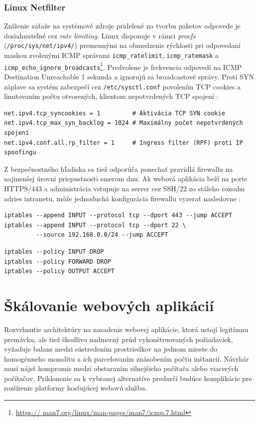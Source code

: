 \documentclass[12pt, a4paper]{article}
\begin{document}
\subsubsection{Linux Netfilter}
Zníženie záťaže na systémové zdroje pridelené na tvorbu paketov odpovede je dosiahnuteľné cez 
\emph{rate limiting}. Linux disponuje v rámci \emph{procfs} (\verb|/proc/sys/net/ipv4/|) premennými 
na obmedzenie rýchlosti pri odpovedaní maskou zvolenými ICMP správami \verb|icmp_ratelimit|, 
\verb|icmp_ratemask| a \verb|icmp_echo_ignore_broadcasts|\footnote{\url{https://
man7.org/linux/man-pages/man7/icmp.7.html}}. Predvolene je frekvencia odpovedí na 
ICMP Destination Unreachable 1 sekunda a ignorujú sa broadcastové správy. Proti SYN záplave sa
systém zabezpečí cez \verb|/etc/sysctl.conf| povolením TCP cookies a limitovaním
počtu otvorených, klientom nepotvrdených TCP spojení \cite{haproxy-ddos}:
\begin{lstlisting}
net.ipv4.tcp_syncookies = 1         # Aktivácia TCP SYN cookie
net.ipv4.tcp_max_syn_backlog = 1024 # Maximálny počet nepotvrdených spojení
net.ipv4.conf.all.rp_filter = 1     # Ingress filter (RPF) proti IP spoofingu  
\end{lstlisting}

Z bezpečnostného hľadiska sa tiež odporúča ponechať pravidlá firewallu na najmenšej úrovni priepustnosti 
smerom dnu. Ak webová aplikácia beží na porte HTTPS/443 a 
administrácia vstupuje na server cez SSH/22 zo stáleho rozsahu adries intranetu, môže jednoduchá 
konfigurácia firewallu vyzerať nasledovne \cite{csirt-hardening}:
\begin{lstlisting}[caption=Pravidlá pre povolenie prichádzajúcej komunikácie cez SSH a HTTPS]
iptables --append INPUT --protocol tcp --dport 443 --jump ACCEPT
iptables --append INPUT --protocol tcp --dport 22 \ 
         --source 192.168.0.0/24 --jump ACCEPT
\end{lstlisting}

\begin{lstlisting}[caption=Politiky reťazí pravidiel sú zahodiť všetko okrem odchádzajúcich paketov]
iptables --policy INPUT DROP
iptables --policy FORWARD DROP
iptables --policy OUTPUT ACCEPT
\end{lstlisting}

\section{Škálovanie webových aplikácií}
Rozvrhnutie architektúry na nasadenie webovej aplikácie, ktorá ustojí legitímnu premávku, ale tiež 
škodlivo nadmerný prúd vykonštruovaných požiadaviek, vyžaduje balans medzi sústredením prostriedkov na 
jednom mieste do homogénneho monolitu a ich parcelovaním znásobením počtu inštancií. Návrhár musí 
nájsť kompromis medzi obstaraním silnejšieho počítača alebo viacerých počítačov. Priklonenie 
sa k vybranej alternatíve predurčí budúce komplikácie pre rozšírenie platformy hosťujúcej webovú 
službu. 
\end{document}
